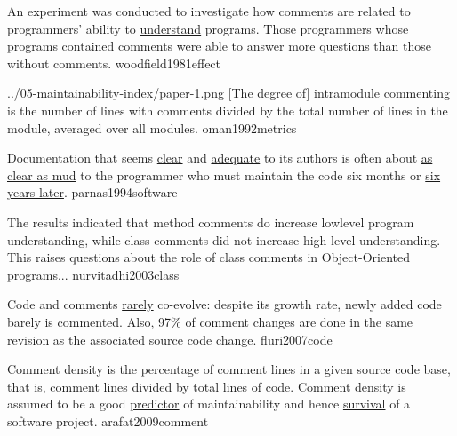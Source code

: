 \documentclass{article}
\begin{document}

  {An experiment was conducted to investigate how comments are related to programmers' ability to \ul{understand} programs. Those programmers whose programs contained comments were able to \ul{answer} more questions than those without comments.}
  {woodfield1981effect}

\qte
  {../05-maintainability-index/paper-1.png}
  {[The degree of] \ul{intramodule commenting} is the number of lines with comments divided by the total number of lines in the module, averaged over all modules.}
  {oman1992metrics}

  {Documentation that seems \ul{clear} and \ul{adequate} to its authors is often about \ul{as clear as mud} to the programmer who must maintain the code six months or \ul{six years later}.}
  {parnas1994software}


  {The results indicated that method comments do increase lowlevel program understanding, while class comments did not increase high-level understanding. This raises questions about the role of class comments in Object-Oriented programs...}
  {nurvitadhi2003class}

  {Code and comments \ul{rarely} co-evolve: despite its growth rate, newly added code barely is commented. Also, 97\% of comment changes are done in the same revision as the associated source code change.}
  {fluri2007code}

  {Comment density is the percentage of comment lines in a given source code base, that is, comment lines divided by total lines of code. Comment density is assumed to be a good \ul{predictor} of maintainability and hence \ul{survival} of a software project.}
  {arafat2009comment}
\end{document}
